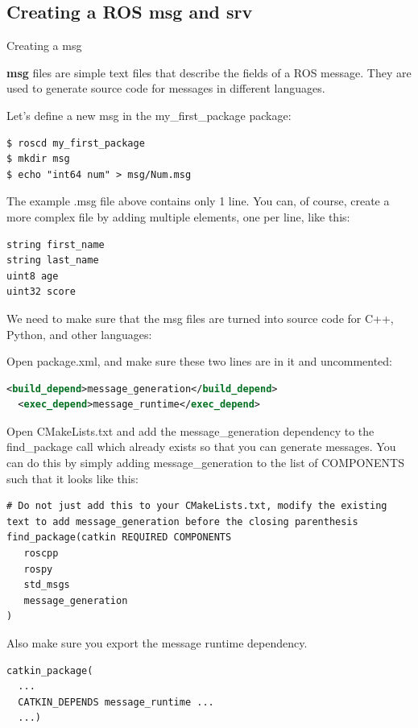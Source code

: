 \subsection{Creating a ROS msg and srv}

\begin{frame}{Creating a msg}

\textbf{msg} files are simple text files that describe the fields of a ROS message. They are used to generate source code for messages in different languages.

\vspace{.1cm}
Let's define a new msg in the my\_first\_package package:
\begin{lstlisting}[language=shell]
$ roscd my_first_package
$ mkdir msg
$ echo "int64 num" > msg/Num.msg
\end{lstlisting}

The example .msg file above contains only 1 line. You can, of course, create a more complex file by adding multiple elements, one per line, like this:

\begin{lstlisting}[language=shell]
string first_name
string last_name
uint8 age
uint32 score
\end{lstlisting}

We need to make sure that the msg files are turned into source code for C++, Python, and other languages:

\vspace{.1cm}
Open package.xml, and make sure these two lines are in it and uncommented:
\begin{lstlisting}[language=xml]
  <build_depend>message_generation</build_depend>
  <exec_depend>message_runtime</exec_depend>
\end{lstlisting}

Open CMakeLists.txt and add the message\_generation dependency to the find\_package call which already exists so that you can generate messages. You can do this by simply adding message\_generation to the list of COMPONENTS such that it looks like this:

\begin{lstlisting}[language=shell]
# Do not just add this to your CMakeLists.txt, modify the existing text to add message_generation before the closing parenthesis
find_package(catkin REQUIRED COMPONENTS
   roscpp
   rospy
   std_msgs
   message_generation
)
\end{lstlisting}

Also make sure you export the message runtime dependency.
\begin{lstlisting}[language=shell]
catkin_package(
  ...
  CATKIN_DEPENDS message_runtime ...
  ...)
\end{lstlisting}


\end{frame}
